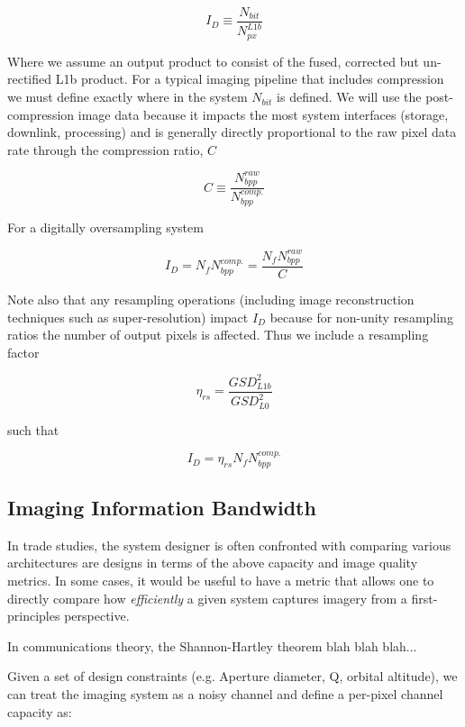 \documentclass[10pt,journal]{IEEEtran}  %
\begin{document}
$$I_D \equiv \frac{N_{bit}}{N_{px}^{L1b}}$$

Where we assume an output product to consist of the fused, corrected but un-rectified L1b product. For a typical imaging pipeline that includes compression we must define exactly where in the system $N_{bit}$ is defined.  We will use the post-compression image data because it impacts the most system interfaces (storage, downlink, processing) and is generally directly proportional to the raw pixel data rate through the compression ratio, $C$

\begin{equation}
    \label{eq:compression}
    C \equiv \frac{N_{bpp}^{raw}}{N_{bpp}^{comp.}}
\end{equation}

For a digitally oversampling system

\begin{equation}
    I_D = N_f N_{bpp}^{comp.} = \frac{N_f N_{bpp}^{raw}}{C}
\end{equation}

Note also that any resampling operations (including image reconstruction techniques such as super-resolution) impact $I_D$ because for non-unity resampling ratios the number of output pixels is affected.  Thus we include a resampling factor

$${\eta}_{rs} = \frac{GSD_{L1b}^2}{GSD_{L0}^2}$$

such that

\begin{equation}
    I_D = {\eta}_{rs} N_f N_{bpp}^{comp.}
\end{equation}


\subsection{Imaging Information Bandwidth}
\label{sec:info_bw}
In trade studies, the system designer is often confronted with comparing various architectures are designs in terms of the above capacity and image quality metrics.  In some cases, it would be useful to have a metric that allows one to directly compare how \emph{efficiently} a given system captures imagery from a first-principles perspective.

In communications theory, the Shannon-Hartley theorem blah blah blah...

Given a set of design constraints (e.g. Aperture diameter, Q, orbital altitude), we can treat the imaging system as a noisy channel and define a per-pixel channel capacity as:
\end{document}
